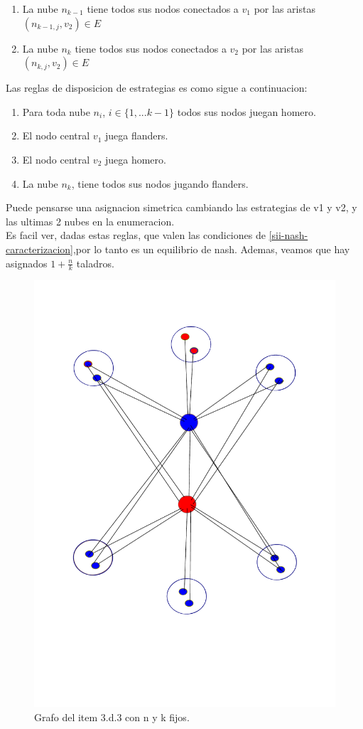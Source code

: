 \begin{enumerate}
\begin{enumerate}
		\item La nube $n_{k-1}$ tiene todos sus nodos conectados a $v_1$ por las aristas $(n_{k-1,j}, v_2) \in E$
		\item La nube $n_{k}$ tiene todos sus nodos conectados a $v_2$ por las aristas $(n_{k,j}, v_2) \in E$
	\end{enumerate}
	Las reglas de disposicion de estrategias es como sigue a continuacion:
	\begin{enumerate}
		\item Para toda nube $n_i$, $i \in\{1,...k-1\}$ todos sus nodos juegan homero.
		\item El nodo central $v_1$ juega flanders.
		\item El nodo central $v_2$ juega homero.
		\item La nube $n_k$, tiene todos sus nodos jugando flanders.
	\end{enumerate}
	Puede pensarse una asignacion simetrica cambiando las estrategias de v1 y v2, y las ultimas 2 nubes en la enumeracion.\\
	Es facil ver, dadas estas reglas, que valen las condiciones de \ref{sii-nash-caracterizacion},por lo tanto es un equilibrio de nash. Ademas, veamos que hay asignados $1 + \frac{n}{k}$ taladros.
	\begin{figure}[H]
		\label{3d2b}
	  \centering	
		\includegraphics[scale=0.30]{fig/grafo3d3.pdf}
	  \caption{Grafo del item 3.d.3 con n y k fijos.}
	\end{figure}
\end{enumerate}


